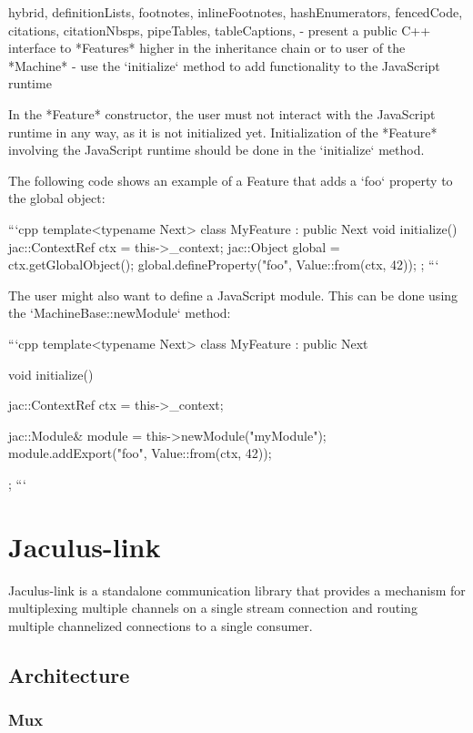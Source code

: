 \documentclass[
  digital,
  oneside,
  nosansbold,
  nocolorbold,
  lof,
  lot
]{fithesis4}
\begin{document}
\begin{markdown*}{%
  hybrid,
  definitionLists,
  footnotes,
  inlineFootnotes,
  hashEnumerators,
  fencedCode,
  citations,
  citationNbsps,
  pipeTables,
  tableCaptions,
}
  - present a public C++ interface to *Features* higher in the inheritance chain or to user of the *Machine*
  - use the `initialize` method to add functionality to the JavaScript runtime

In the *Feature* constructor, the user must not interact with the JavaScript runtime in any way, as it is not initialized yet. Initialization of the *Feature* involving the JavaScript runtime should be done in the `initialize` method.

The following code shows an example of a Feature that adds a `foo` property to the global object:

```cpp
template<typename Next>
class MyFeature : public Next {
    void initialize() {
        jac::ContextRef ctx = this->_context;
        jac::Object global = ctx.getGlobalObject();
        global.defineProperty("foo", Value::from(ctx, 42));
    }
};
```

The user might also want to define a JavaScript module. This can be done using the `MachineBase::newModule` method:

```cpp
template<typename Next>
class MyFeature : public Next {
    void initialize() {
        jac::ContextRef ctx = this->_context;

        jac::Module& module = this->newModule("myModule");
        module.addExport("foo", Value::from(ctx, 42));
    }
};
```


\chapter{Jaculus-link}

Jaculus-link is a standalone communication library that provides a mechanism for multiplexing multiple channels on a single stream connection and routing multiple channelized connections to a single consumer.



\section{Architecture}

\subsection{Mux}


\end{markdown*}
\end{document}
